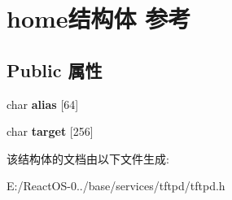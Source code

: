 \hypertarget{structhome}{}\section{home结构体 参考}
\label{structhome}
\subsection*{Public 属性}
\begin{DoxyCompactItemize}
\item 
\mbox{\label{structhome_a61bf3c001da9ce89d039ced9d99a2d2e}} 
char {\bfseries alias} \mbox{[}64\mbox{]}
\item 
\mbox{\label{structhome_a9f34b4d0374bf3e2f3a612d1cb1eafda}} 
char {\bfseries target} \mbox{[}256\mbox{]}
\end{DoxyCompactItemize}


该结构体的文档由以下文件生成\+:\begin{DoxyCompactItemize}
\item 
E\+:/\+React\+O\+S-\/0../base/services/tftpd/tftpd.\+h\end{DoxyCompactItemize}
